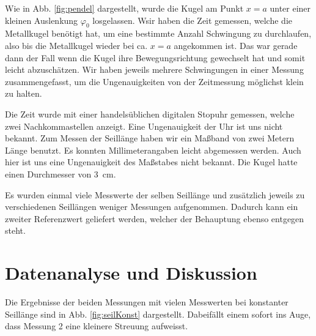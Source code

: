 \documentclass[11pt,a4paper,titlepage, ngerman]{article}
\begin{document}
		Wie in Abb. \ref{fig:pendel} dargestellt, wurde die Kugel am Punkt $x = a$ unter einer kleinen Auslenkung $\varphi_0$ losgelassen.
		Wsir haben die Zeit gemessen, welche die Metallkugel benötigt hat, um eine bestimmte Anzahl Schwingung zu durchlaufen, also bis die Metallkugel wieder bei ca. $x = a$ angekommen ist.
		Das war gerade dann der Fall wenn die Kugel ihre Bewegungsrichtung gewechselt hat und somit leicht abzuschätzen.
		Wir haben jeweils mehrere Schwingungen in einer Messung zusammengefasst, um die Ungenauigkeiten von der Zeitmessung möglichst klein zu halten. 
		
		Die Zeit wurde mit einer handelsüblichen digitalen Stopuhr gemessen, welche zwei Nachkommastellen anzeigt.
		Eine Ungenauigkeit der Uhr ist uns nicht bekannt.
		Zum Messen der Seillänge haben wir ein Maßband von zwei Metern Länge benutzt. Es konnten Millimeterangaben leicht abgemessen werden.
		Auch hier ist uns eine Ungenauigkeit des Maßstabes nicht bekannt.
		Die Kugel hatte einen Durchmesser von \SI{3}{\cm}.
		
		Es wurden einmal viele Messwerte der selben Seillänge und zusätzlich jeweils zu verschiedenen Seillängen weniger Messungen aufgenommen.
		Dadurch kann ein zweiter Referenzwert geliefert werden, welcher der Behauptung ebenso entgegen steht.
		
	\section{Datenanalyse und Diskussion}
		Die Ergebnisse der beiden Messungen mit vielen Messwerten bei konstanter Seillänge sind in Abb. \ref{fig:seilKonst} dargestellt.
		Dabeifällt einem sofort ins Auge, dass Messung 2 eine kleinere Streuung aufweisst.
				
\end{document}
